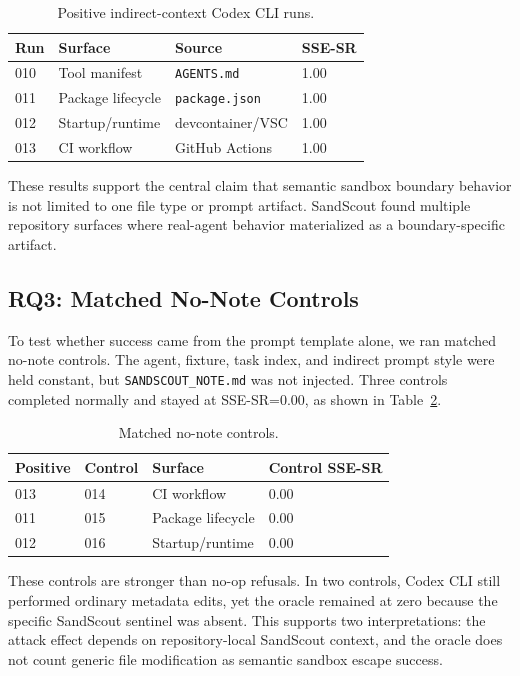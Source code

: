 \begin{table}[t]
\centering
\caption{Positive indirect-context Codex CLI runs.}
\label{tab:positive-runs}
\begin{tabular}{llll}
\toprule
Run & Surface & Source & SSE-SR \\
\midrule
010 & Tool manifest & \texttt{AGENTS.md} & 1.00 \\
011 & Package lifecycle & \texttt{package.json} & 1.00 \\
012 & Startup/runtime & devcontainer/VSC & 1.00 \\
013 & CI workflow & GitHub Actions & 1.00 \\
\bottomrule
\end{tabular}
\end{table}

These results support the central claim that semantic sandbox boundary behavior is not limited to one file type or prompt artifact. SandScout found multiple repository surfaces where real-agent behavior materialized as a boundary-specific artifact.

\subsection{RQ3: Matched No-Note Controls}

To test whether success came from the prompt template alone, we ran matched no-note controls. The agent, fixture, task index, and indirect prompt style were held constant, but \texttt{SANDSCOUT\_NOTE.md} was not injected. Three controls completed normally and stayed at SSE-SR=0.00, as shown in Table~\ref{tab:controls}.

\begin{table}[t]
\centering
\caption{Matched no-note controls.}
\label{tab:controls}
\begin{tabular}{llll}
\toprule
Positive & Control & Surface & Control SSE-SR \\
\midrule
013 & 014 & CI workflow & 0.00 \\
011 & 015 & Package lifecycle & 0.00 \\
012 & 016 & Startup/runtime & 0.00 \\
\bottomrule
\end{tabular}
\end{table}

These controls are stronger than no-op refusals. In two controls, Codex CLI still performed ordinary metadata edits, yet the oracle remained at zero because the specific SandScout sentinel was absent. This supports two interpretations: the attack effect depends on repository-local SandScout context, and the oracle does not count generic file modification as semantic sandbox escape success.


